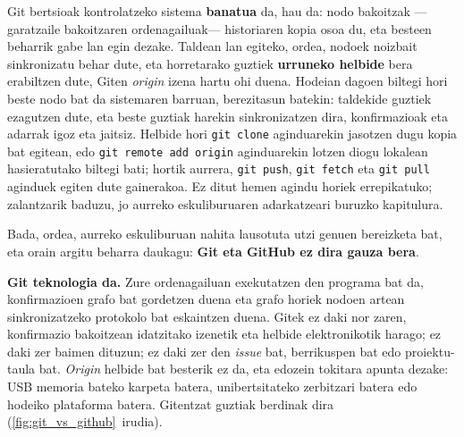 Git bertsioak kontrolatzeko sistema \textbf{banatua} da, hau da: nodo bakoitzak ---garatzaile bakoitzaren ordenagailuak--- historiaren kopia osoa du, eta besteen beharrik gabe lan egin dezake.
Taldean lan egiteko, ordea, nodoek noizbait sinkronizatu behar dute, eta horretarako guztiek \textbf{urruneko helbide} bera erabiltzen dute, Giten \textit{origin} izena hartu ohi duena.
Hodeian dagoen biltegi hori beste nodo bat da sistemaren barruan, berezitasun batekin: taldekide guztiek ezagutzen dute, eta beste guztiak harekin sinkronizatzen dira, konfirmazioak eta adarrak igoz eta jaitsiz.
Helbide hori \verb|git clone| aginduarekin jasotzen dugu kopia bat egitean, edo \verb|git remote add origin| aginduarekin lotzen diogu lokalean hasieratutako biltegi bati; hortik aurrera, \verb|git push|, \verb|git fetch| eta \verb|git pull| aginduek egiten dute gainerakoa.
Ez ditut hemen agindu horiek errepikatuko; zalantzarik baduzu, jo aurreko eskuliburuaren adarkatzeari buruzko kapitulura.

Bada, ordea, aurreko eskuliburuan nahita lausotuta utzi genuen bereizketa bat, eta orain argitu beharra daukagu: \textbf{Git eta GitHub ez dira gauza bera}.

\textbf{Git teknologia da.}
Zure ordenagailuan exekutatzen den programa bat da, konfirmazioen grafo bat gordetzen duena eta grafo horiek nodoen artean sinkronizatzeko protokolo bat eskaintzen duena.
Gitek ez daki nor zaren, konfirmazio bakoitzean idatzitako izenetik eta helbide elektronikotik harago; ez daki zer baimen dituzun; ez daki zer den \textit{issue} bat, berrikuspen bat edo proiektu-taula bat.
\textit{Origin} helbide bat besterik ez da, eta edozein tokitara apunta dezake: USB memoria bateko karpeta batera, unibertsitateko zerbitzari batera edo hodeiko plataforma batera.
Gitentzat guztiak berdinak dira (\ref{fig:git_vs_github}~irudia).

